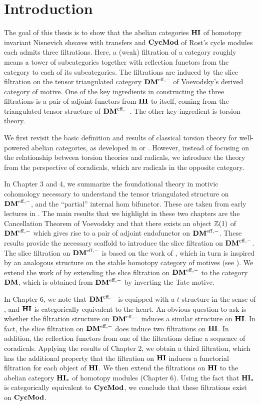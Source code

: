 \chapter{Introduction} 

The goal of this thesis is to show that the abelian categories
$\mathbf{HI}$ of homotopy invariant Nisnevich sheaves with transfers and 
$\mathbf{CycMod}$ of Rost's cycle modules each admits
three filtrations. Here, a (weak) filtration of a category roughly 
means a tower of subcategories together with reflection functors 
from the category to each of its subcategories. The filtrations 
are induced by the slice filtration on the tensor triangulated 
category $\mathbf{DM}^{\mathrm{eff},-}$ of Voevodsky's derived category of motive. 
One of the key ingredients in constructing the three filtrations 
is a pair of adjoint functors from $\mathbf{HI}$ to itself, coming from the 
triangulated tensor structure of $\mathbf{DM}^{\mathrm{eff},-}$. The other key 
ingredient is torsion theory.
 
We first revisit the basic definition and results of
classical torsion theory for well-powered abelian categories, as 
developed in \cite{BJV} or \cite{DTor}. However, instead of focusing
on the relationship between torsion theories and radicals, we
introduce the theory from the perspective of coradicals, which are 
radicals in the opposite category.  

In Chapter 3 and 4, we summarize the foundational theory in 
motivic cohomology necessary to understand the tensor triangulated 
structure on $\mathbf{DM}^{\mathrm{eff},-}$, and the ``partial'' internal hom bifunctor. 
These are taken from early lectures in \cite{MVW}. The main 
results that we highlight in these two chapters are the 
Cancellation Theorem of Voevodsky and that there exists an object 
$\mathbb{Z}(1)$ of $\mathbf{DM}^{\mathrm{eff},-}$ which gives rise to a pair of adjoint endofunctor
on $\mathbf{DM}^{\mathrm{eff},-}$. These results provide the necessary scaffold to 
introduce the slice filtration on $\mathbf{DM}^{\mathrm{eff},-}$. The slice filtration on
$\mathbf{DM}^{\mathrm{eff},-}$ is based on the work of \cite{HuKa}, which in turn is
inspired by an analogous structure on the stable homotopy category
of motives (see \cite{VOP}). We extend the work of \cite{HuKa} by
extending the slice filtration on $\mathbf{DM}^{\mathrm{eff},-}$ to the category $\mathbf{DM}$, 
which is obtained from $\mathbf{DM}^{\mathrm{eff},-}$ by inverting the Tate motive.

In Chapter 6, we note that $\mathbf{DM}^{\mathrm{eff},-}$ is equipped with a 
$t$-structure in the sense of \cite{BBD}, and $\mathbf{HI}$ is categorically
equivalent to the heart. An obvious question to ask is whether the
filtration structure on $\mathbf{DM}^{\mathrm{eff},-}$ induces a similar structure on
$\mathbf{HI}$. In fact, the slice filtration on $\mathbf{DM}^{\mathrm{eff},-}$ does induce two
filtrations on $\mathbf{HI}$. In addition, the reflection functors from
one of the filtrations define a sequence of coradicals. Applying
the results of Chapter 2, we obtain a third filtration, which has
the additional property that the filtration on $\mathbf{HI}$ induces a 
functorial filtration for each object of $\mathbf{HI}$. We then extend the 
filtrations on $\mathbf{HI}$ to the abelian category $\mathbf{HI}_*$ of homotopy 
modules (Chapter 6). Using the fact that $\mathbf{HI}_*$ is categorically 
equivalent to $\mathbf{CycMod}$, we conclude that these filtrations exist 
on $\mathbf{CycMod}$. 

